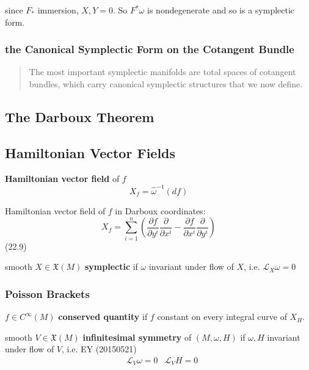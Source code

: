 since $F_*$ immersion, $X,Y=0$.  So $F^*\omega$ is nondegenerate and so is a symplectic form.  


\subsubsection{the Canonical Symplectic Form on the Cotangent Bundle}

\begin{quote}
The most important symplectic manifolds are total spaces of cotangent bundles, which carry canonical symplectic structures that we now define.
\end{quote}


\subsection{The Darboux Theorem}

\subsection{Hamiltonian Vector Fields}

\textbf{Hamiltonian vector field} of $f$
\[
X_f = \widehat{\omega}^{-1}(df)
\]

Hamiltonian vector field of $f$ in Darboux coordinates:
\begin{equation}
  X_f = \sum_{i=1}^n \left( \frac{ \partial f}{ \partial y^i} \frac{ \partial }{ \partial x^i } - \frac{ \partial f}{ \partial x^i} \frac{\partial}{ \partial y^i} \right)
\end{equation}
(22.9)



smooth $X \in \mathfrak{X}(M)$ \textbf{symplectic} if $\omega$ invariant under flow of $X$, i.e. $\mathcal{L}_X \omega =0$


\subsubsection{Poisson Brackets}

$f \in C^{\infty}(M)$ \textbf{conserved quantity} if $f$ constant on every integral curve of $X_H$.  

smooth $V \in \mathfrak{X}(M)$ \textbf{infinitesimal symmetry} of $(M,\omega,H)$ if $\omega,H$ invariant under flow of $V$, i.e. EY (20150521) 
\[
\begin{aligned}
  & \mathcal{L}_V \omega = 0
  & \mathcal{L}_V H = 0
\end{aligned}
\]

